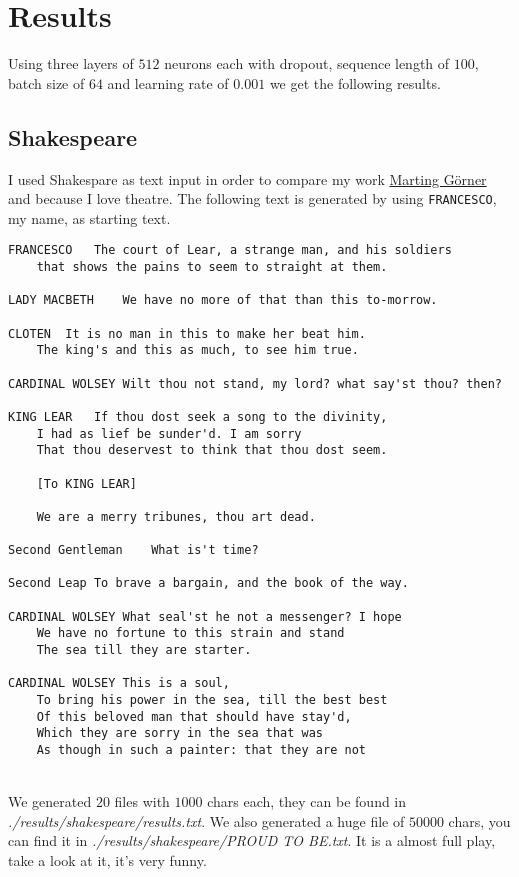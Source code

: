 \documentclass[11pt]{article}
\begin{document}
\section{Results}
Using three layers of $512$ neurons each with dropout, sequence length of $100$, batch size of $64$ and learning rate of $0.001$ we get the following results.
\subsection{Shakespeare}
I used Shakespare as text input in order to compare my work \href{https://www.youtube.com/watch?v=vq2nnJ4g6N0}{Marting Görner} and because I love theatre. The following text is generated by using \texttt{FRANCESCO}, my name, as starting text. \\
\begin{lstlisting}[breaklines=true]
FRANCESCO	The court of Lear, a strange man, and his soldiers
	that shows the pains to seem to straight at them.

LADY MACBETH	We have no more of that than this to-morrow.

CLOTEN	It is no man in this to make her beat him.
	The king's and this as much, to see him true.

CARDINAL WOLSEY	Wilt thou not stand, my lord? what say'st thou? then?

KING LEAR	If thou dost seek a song to the divinity,
	I had as lief be sunder'd. I am sorry
	That thou deservest to think that thou dost seem.

	[To KING LEAR]

	We are a merry tribunes, thou art dead.

Second Gentleman	What is't time?

Second Leap	To brave a bargain, and the book of the way.

CARDINAL WOLSEY	What seal'st he not a messenger? I hope
	We have no fortune to this strain and stand
	The sea till they are starter.

CARDINAL WOLSEY	This is a soul,
	To bring his power in the sea, till the best best
	Of this beloved man that should have stay'd,
	Which they are sorry in the sea that was
	As though in such a painter: that they are not
\end{lstlisting}\\
We generated $20$ files with $1000$ chars each, they can be found in \emph{./results/shakespeare/results.txt}. We also generated a huge file of $50000$ chars, you can find it in \emph{./results/shakespeare/PROUD TO BE.txt}. It is a almost full play, take a look at it, it's very funny.
\end{document}

